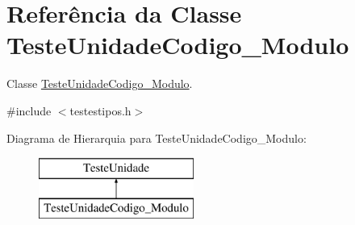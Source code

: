 \hypertarget{class_teste_unidade_codigo___modulo}{
\section{\-Referência da \-Classe \-Teste\-Unidade\-Codigo\-\_\-\-Modulo}
\label{class_teste_unidade_codigo___modulo}
}


\-Classe \hyperlink{class_teste_unidade_codigo___modulo}{\-Teste\-Unidade\-Codigo\-\_\-\-Modulo}.  




{\ttfamily \#include $<$testestipos.\-h$>$}

\-Diagrama de \-Hierarquia para \-Teste\-Unidade\-Codigo\-\_\-\-Modulo\-:\begin{figure}[H]
\begin{center}
\leavevmode
\includegraphics[height=2.000000cm]{class_teste_unidade_codigo___modulo}
\end{center}
\end{figure}
